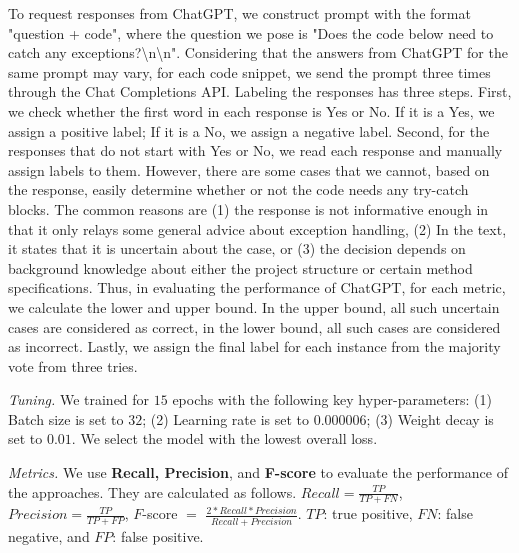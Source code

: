 To request responses from ChatGPT, we construct prompt with the format
"question + code", where the question we pose is "Does the code below
need to catch any exceptions?\textbackslash n\textbackslash n".
Considering that the answers from ChatGPT for the same prompt may
vary, for each code snippet, we send the prompt three times through
the Chat Completions API.
Labeling the responses has three steps. First, we check whether the
first word in each response is Yes or No. If it is a Yes, we assign a
positive label; If it is a No, we assign a negative label. Second, for
the responses that do not start with Yes or No, we read each response
and manually assign labels to them.  However, there are some cases
that we cannot, based on the response, easily determine whether or not
the code needs any try-catch blocks. The common reasons are (1) the
response is not informative enough in that it only relays some general
advice about exception handling, (2) In the text, it states that it is
uncertain about the case, or (3) the decision depends on background
knowledge about either the project structure or certain method
specifications. Thus, in evaluating the performance of ChatGPT,
for each metric, we calculate the lower and upper bound. In the upper
bound, all such uncertain cases are considered as correct,
in the lower bound, all such cases are considered as incorrect.
Lastly, we assign the final label for each instance from the majority
vote from three tries.



{\em Tuning.} We trained {\tool} for $15$ epochs with the following key hyper-parameters: (1) Batch size is set to $32$; (2) Learning rate is set to $0.000006$; (3) Weight decay is set to $0.01$. We select the model with the lowest overall loss. 


{\em Metrics.} We use \textbf{Recall, Precision}, and {\bf F-score} to
evaluate the performance of the approaches. They are calculated as follows.
$Recall = \frac{TP}{TP+FN}$, $Precision = \frac{TP}{TP+FP}$, $F$-score
$=$ $\frac{2*Recall*Precision}{Recall+Precision}$. $TP$: true
positive, $FN$: false negative, and $FP$: false positive.
